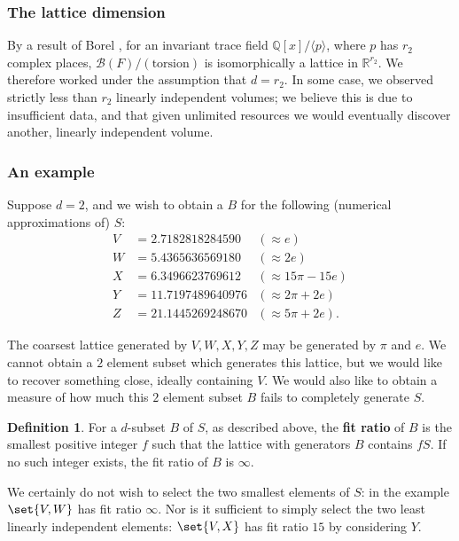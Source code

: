 \documentclass[10pt]{amsart}
\numberwithin{equation}{theorem}
\theoremstyle{definition}
\newtheorem{definition}[theorem]{Definition}
\newcommand{\definedterm}[1]{\textbf{#1}}
\newcommand{\bloch}[1]{\mathcal{B}(#1)}
\begin{document}
\subsubsection{The lattice dimension}

By a result of Borel \parencite[397]{neumannhilberts3rd}, for an
invariant trace field $\mathbb{Q}[x]/\langle p \rangle$, where $p$ has
$r_2$ complex places, $\bloch{F}/(\text{torsion})$ is isomorphically a
lattice in $\mathbb{R}^{r_2}$. We therefore worked under the
assumption that $d = r_2$.  In some case, we observed strictly less
than $r_2$ linearly independent volumes; we believe this is due to
insufficient data, and that given unlimited resources we would
eventually discover another, linearly independent volume.

\subsubsection{An example}

Suppose $d = 2$, and we wish to obtain a $B$ for the following (numerical
approximations of) $S$:
\begin{align*}
  V &= 2.7182818284590 & (\approx e) \\
  W &= 5.4365636569180 & (\approx 2 e) \\
  X &= 6.3496623769612 & (\approx 15 \pi - 15 e) \\
  Y &= 11.7197489640976 & (\approx 2 \pi + 2 e) \\
  Z &= 21.1445269248670 & (\approx 5 \pi + 2 e).
\end{align*}

The coarsest lattice generated by $V,W,X,Y,Z$ may be generated by
$\pi$ and $e$.  We cannot obtain a $2$ element subset which generates
this lattice, but we would like to recover something close, ideally
containing $V$. We would also like to obtain a measure of how much
this $2$ element subset $B$ fails to completely generate $S$.

\begin{definition}
  For a $d$-subset $B$ of $S$, as described above, the \definedterm{fit
  ratio} of $B$ is the smallest positive integer $f$ such that the
  lattice with generators $B$ contains $fS$. If no such integer exists,
  the fit ratio of $B$ is $\infty$.
\end{definition}

We certainly do not wish to select the two smallest elements of $S$:
in the example $\set{V,W}$ has fit ratio $\infty$.  Nor is it
sufficient to simply select the two least linearly independent
elements: $\set{V, X}$ has fit ratio $15$ by considering $Y$.
\end{document}
